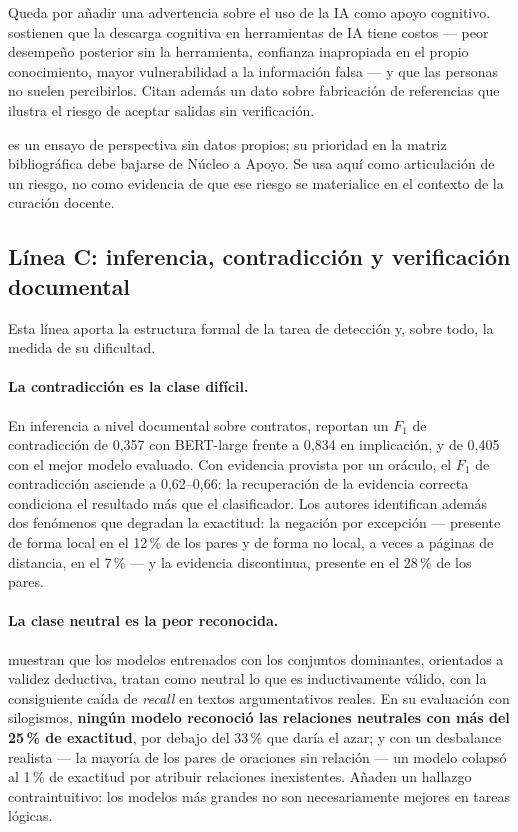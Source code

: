 Queda por añadir una advertencia sobre el uso de la IA como apoyo cognitivo.
\textcite{atchley2024human} sostienen que la descarga cognitiva en herramientas de IA
tiene costos --- peor desempeño posterior sin la herramienta, confianza inapropiada
en el propio conocimiento, mayor vulnerabilidad a la información falsa --- y que las
personas no suelen percibirlos. Citan además un dato sobre fabricación de referencias
que ilustra el riesgo de aceptar salidas sin verificación.

\begin{advertencia}
\textcite{atchley2024human} es un ensayo de perspectiva sin datos propios; su
prioridad en la matriz bibliográfica debe bajarse de Núcleo a Apoyo. Se usa aquí como
articulación de un riesgo, no como evidencia de que ese riesgo se materialice en el
contexto de la curación docente.
\end{advertencia}

\subsection{Línea C: inferencia, contradicción y verificación documental}
\label{sec:arte-c}

Esta línea aporta la estructura formal de la tarea de detección y, sobre todo, la
medida de su dificultad.

\paragraph{La contradicción es la clase difícil.}
En inferencia a nivel documental sobre contratos,
\textcite{koreeda2021contractnli} reportan un $F_1$ de contradicción de 0,357 con
BERT-large frente a 0,834 en implicación, y de 0,405 con el mejor modelo evaluado. Con
evidencia provista por un oráculo, el $F_1$ de contradicción asciende a 0,62--0,66:
la recuperación de la evidencia correcta condiciona el resultado más que el
clasificador. Los autores identifican además dos fenómenos que degradan la exactitud:
la negación por excepción --- presente de forma local en el 12\,\% de los pares y de
forma no local, a veces a páginas de distancia, en el 7\,\% --- y la evidencia
discontinua, presente en el 28\,\% de los pares.

\paragraph{La clase neutral es la peor reconocida.}
\textcite{gubelmann2024capturing} muestran que los modelos entrenados con los
conjuntos dominantes, orientados a validez deductiva, tratan como neutral lo que es
inductivamente válido, con la consiguiente caída de \emph{recall} en textos
argumentativos reales. En su evaluación con silogismos,
\textbf{ningún modelo reconoció las relaciones neutrales con más del 25\,\% de
exactitud}, por debajo del 33\,\% que daría el azar; y con un desbalance realista ---
la mayoría de los pares de oraciones sin relación --- un modelo colapsó al 1\,\% de
exactitud por atribuir relaciones inexistentes. Añaden un hallazgo contraintuitivo:
los modelos más grandes no son necesariamente mejores en tareas lógicas.

